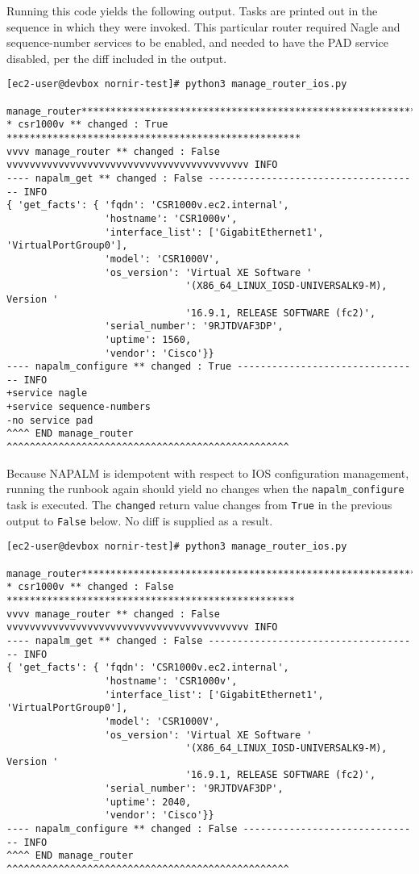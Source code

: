 Running this code yields the following output. Tasks are printed out in the
sequence in which they were invoked. This particular router required Nagle and
sequence-number services to be enabled, and needed to have the PAD service
disabled, per the diff included in the output.

\begin{verbatim}
[ec2-user@devbox nornir-test]# python3 manage_router_ios.py

manage_router***********************************************************
* csr1000v ** changed : True ***************************************************
vvvv manage_router ** changed : False vvvvvvvvvvvvvvvvvvvvvvvvvvvvvvvvvvvvvvvvvv INFO
---- napalm_get ** changed : False ------------------------------------- INFO
{ 'get_facts': { 'fqdn': 'CSR1000v.ec2.internal',
                 'hostname': 'CSR1000v',
                 'interface_list': ['GigabitEthernet1', 'VirtualPortGroup0'],
                 'model': 'CSR1000V',
                 'os_version': 'Virtual XE Software '
                               '(X86_64_LINUX_IOSD-UNIVERSALK9-M), Version '
                               '16.9.1, RELEASE SOFTWARE (fc2)',
                 'serial_number': '9RJTDVAF3DP',
                 'uptime': 1560,
                 'vendor': 'Cisco'}}
---- napalm_configure ** changed : True -------------------------------- INFO
+service nagle
+service sequence-numbers
-no service pad
^^^^ END manage_router ^^^^^^^^^^^^^^^^^^^^^^^^^^^^^^^^^^^^^^^^^^^^^^^^^
\end{verbatim}

Because NAPALM is idempotent with respect to IOS configuration management,
running the runbook again should yield no changes when the
\verb|napalm_configure| task is executed. The \verb|changed| return value
changes from \verb|True| in the previous output to \verb|False| below. No diff
is supplied as a result.

\begin{verbatim}
[ec2-user@devbox nornir-test]# python3 manage_router_ios.py

manage_router***********************************************************
* csr1000v ** changed : False **************************************************
vvvv manage_router ** changed : False vvvvvvvvvvvvvvvvvvvvvvvvvvvvvvvvvvvvvvvvvv INFO
---- napalm_get ** changed : False ------------------------------------- INFO
{ 'get_facts': { 'fqdn': 'CSR1000v.ec2.internal',
                 'hostname': 'CSR1000v',
                 'interface_list': ['GigabitEthernet1', 'VirtualPortGroup0'],
                 'model': 'CSR1000V',
                 'os_version': 'Virtual XE Software '
                               '(X86_64_LINUX_IOSD-UNIVERSALK9-M), Version '
                               '16.9.1, RELEASE SOFTWARE (fc2)',
                 'serial_number': '9RJTDVAF3DP',
                 'uptime': 2040,
                 'vendor': 'Cisco'}}
---- napalm_configure ** changed : False ------------------------------- INFO
^^^^ END manage_router ^^^^^^^^^^^^^^^^^^^^^^^^^^^^^^^^^^^^^^^^^^^^^^^^^
\end{verbatim}

